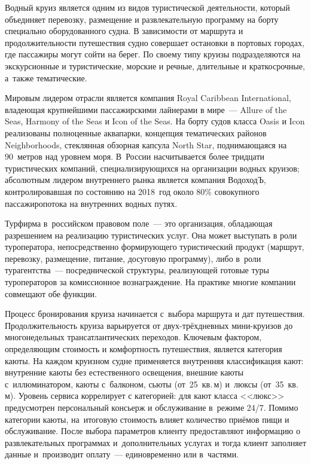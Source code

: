 \documentclass[11pt,a4paper,final]{article}
\begin{document}
	Водный круиз является одним из видов туристической деятельности, который 
	объединяет перевозку, размещение и развлекательную программу
	на борту специально оборудованного судна. В зависимости от маршрута и
	продолжительности путешествия судно совершает остановки в портовых городах,
	где пассажиры могут сойти на берег. По своему типу круизы подразделяются на
	экскурсионные и туристические, морские и речные, длительные и краткосрочные,
	а~также тематические.
	
	Мировым лидером отрасли является компания Royal Caribbean International,
	владеющая крупнейшими пассажирскими лайнерами в мире~--- Allure of the Seas,
	Harmony of the Seas и Icon of the Seas. На борту судов класса Oasis и Icon
	реализованы полноценные аквапарки, концепция тематических районов
	Neighborhoods, стеклянная обзорная капсула North Star, поднимающаяся на
	90~метров над уровнем моря. В~России насчитывается более тридцати
	туристических компаний, специализирующихся на организации водных круизов;
	абсолютным лидером внутреннего рынка является компания ВодоходЪ,
	контролировавшая по состоянию на 2018~год около 80\% совокупного
	пассажиропотока на внутренних водных путях.
	
	Турфирма в~российском правовом поле~--- это организация, обладающая
	разрешением на реализацию туристических услуг. Она может выступать в роли
	туроператора, непосредственно формирующего туристический продукт (маршрут,
	перевозку, размещение, питание, досуговую программу), либо в~роли
	турагентства~--- посреднической структуры, реализующей готовые туры
	туроператоров за комиссионное вознаграждение. На практике многие компании
	совмещают обе функции.
	
	Процесс бронирования круиза начинается с~выбора маршрута и дат путешествия.
	Продолжительность круиза варьируется от двух-трёхдневных мини-круизов до
	многонедельных трансатлантических переходов. Ключевым фактором, определяющим
	стоимость и комфортность путешествия, является категория каюты. На каждом
	круизном судне применяется внутренняя классификация кают: внутренние каюты
	без естественного освещения, внешние каюты с~иллюминатором, каюты с~балконом,
	сьюты (от~25~кв.\,м) и~люксы (от~35~кв.\,м). Уровень сервиса коррелирует с
	категорией: для кают класса <<люкс>> предусмотрен персональный консьерж и
	обслуживание в~режиме 24/7. Помимо категории каюты, на~итоговую стоимость
	влияет количество приёмов пищи и обслуживание. После выбора параметров клиенту
	предоставляют информацию о развлекательных программах и~дополнительных услугах и тогда клиент заполняет данные и~производит оплату~--- единовременно
	или в~частями.
	
\end{document}
